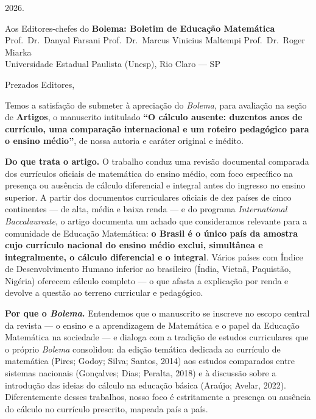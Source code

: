 \documentclass[12pt,a4paper,oneside]{article}
\begin{document}
\noindent\hfill 2026.

\bigskip
\noindent Aos Editores-chefes do \textbf{Bolema: Boletim de Educação Matemática}\\
Prof.\ Dr.\ Danyal Farsani \textbullet{} Prof.\ Dr.\ Marcus Vinicius Maltempi \textbullet{} Prof.\ Dr.\ Roger Miarka\\
Universidade Estadual Paulista (Unesp), Rio Claro --- SP

\bigskip
\noindent Prezados Editores,

Temos a satisfação de submeter à apreciação do \textit{Bolema}, para
avaliação na seção de \textbf{Artigos}, o manuscrito intitulado \textbf{``O
cálculo ausente: duzentos anos de currículo, uma comparação internacional e
um roteiro pedagógico para o ensino médio''}, de nossa autoria e caráter
original e inédito.

\medskip
\noindent\textbf{Do que trata o artigo.}
O trabalho conduz uma revisão documental comparada dos currículos oficiais de
matemática do ensino médio, com foco específico na presença ou ausência de
cálculo diferencial e integral antes do ingresso no ensino superior. A partir
dos documentos curriculares oficiais de dez países de cinco continentes --- de
alta, média e baixa renda --- e do programa \textit{International
Baccalaureate}, o artigo documenta um achado que consideramos relevante para a
comunidade de Educação Matemática: \textbf{o Brasil é o único país da amostra
cujo currículo nacional do ensino médio exclui, simultânea e integralmente, o
cálculo diferencial e o integral}. Vários países com Índice de Desenvolvimento
Humano inferior ao brasileiro (Índia, Vietnã, Paquistão, Nigéria) oferecem
cálculo completo --- o que afasta a explicação por renda e devolve a questão ao
terreno curricular e pedagógico.

\medskip
\noindent\textbf{Por que o \textit{Bolema}.}
Entendemos que o manuscrito se inscreve no escopo central da revista --- o
ensino e a aprendizagem de Matemática e o papel da Educação Matemática na
sociedade --- e dialoga com a tradição de estudos curriculares que o próprio
\textit{Bolema} consolidou: da edição temática dedicada ao currículo de
matemática (Pires; Godoy; Silva; Santos, 2014) aos estudos comparados entre
sistemas nacionais (Gonçalves; Dias; Peralta, 2018) e à discussão sobre a
introdução das ideias do cálculo na educação básica (Araújo; Avelar, 2022).
Diferentemente desses trabalhos, nosso foco é estritamente a presença ou
ausência do cálculo no currículo prescrito, mapeada país a país.
\end{document}
